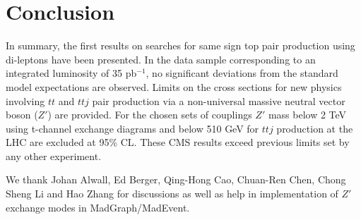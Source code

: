 \section{Conclusion}
\label{sec:conclusion}
In summary, the first results on searches for same sign top pair production using di-leptons have
been presented. In the data sample corresponding to an integrated luminosity of 35 pb$^{-1}$, no significant
deviations from the standard model expectations are observed. Limits on the cross sections for new physics
involving $tt$ and $ttj$  pair production via a non-universal massive neutral vector boson ($Z'$) are provided. 
For the chosen sets of couplings $Z'$ mass below 2 TeV using t-channel exchange diagrams and below 510 GeV 
for $ttj$ production at the LHC are excluded at 95\% CL. These CMS results exceed previous limits set by any 
other experiment.

\ack

We thank Johan Alwall, Ed Berger, Qing-Hong Cao, Chuan-Ren Chen, Chong Sheng Li and Hao Zhang for 
discussions as well as help in implementation of $Z'$ exchange modes in MadGraph/MadEvent. 


